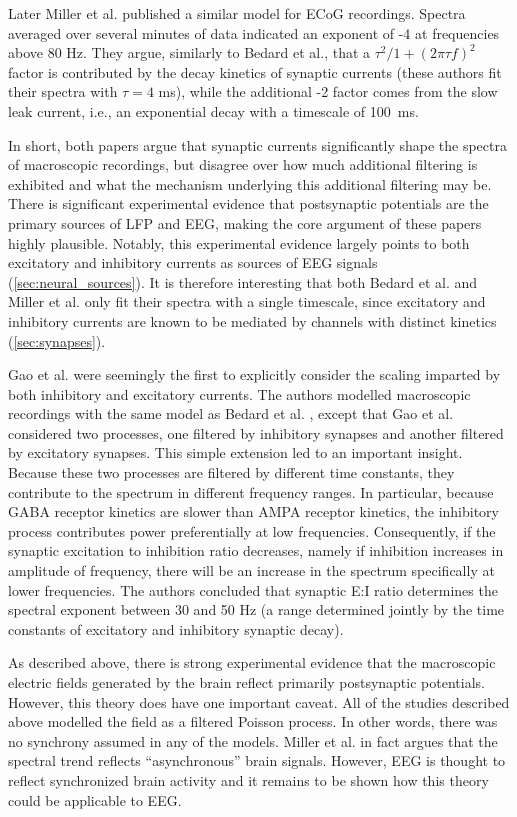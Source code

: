 Later Miller et al. \cite{Miller2009} published a similar model for ECoG recordings. Spectra averaged over several minutes of data indicated an exponent of -4 at frequencies above 80 Hz. They argue, similarly to Bedard et al., that a $\tau^2 / 1+ (2\pi\tau f)^2 $ factor is contributed by the decay kinetics of synaptic currents (these authors fit their spectra with $\tau=4$ \unit{\milli\second}), while the additional -2 factor comes from the slow leak current, i.e., an exponential decay with a timescale of \qty{100}{\milli\second}. 

In short, both papers argue that synaptic currents significantly shape the spectra of macroscopic recordings, but disagree over how much additional filtering is exhibited and what the mechanism underlying this additional filtering may be. There is significant experimental evidence that postsynaptic potentials are the primary sources of LFP and EEG, making the core argument of these papers highly plausible. Notably, this experimental evidence largely points to both excitatory and inhibitory currents as sources of EEG signals (\autoref{sec:neural_sources}). It is therefore interesting that both Bedard et al. and Miller et al. only fit their spectra with a single timescale, since excitatory and inhibitory currents are known to be mediated by channels with distinct kinetics (\autoref{sec:synapses}).

Gao et al. \cite{Gao2017} were seemingly the first to explicitly consider the scaling imparted by both inhibitory and excitatory currents. The authors modelled macroscopic recordings with the same model as Bedard et al. \cite{Bedard2006}, except that Gao et al. considered two processes, one filtered by inhibitory synapses and another filtered by excitatory synapses. This simple extension led to an important insight. Because these two processes are filtered by different time constants, they contribute to the spectrum in different frequency ranges. In particular, because GABA receptor kinetics are slower than AMPA receptor kinetics, the inhibitory process contributes power preferentially at low frequencies. Consequently, if the synaptic excitation to inhibition ratio decreases, namely if inhibition increases in amplitude of frequency, there will be an increase in the spectrum specifically at lower frequencies. The authors concluded that synaptic E:I ratio determines the spectral exponent between 30 and 50 Hz (a range determined jointly by the time constants of excitatory and inhibitory synaptic decay). 

As described above, there is strong experimental evidence that the macroscopic electric fields generated by the brain reflect primarily postsynaptic potentials. However, this theory does have one important caveat. All of the studies described above modelled the field as a filtered Poisson process. In other words, there was no synchrony assumed in any of the models. Miller et al.\cite{Miller2009} in fact argues that the spectral trend reflects ``asynchronous'' brain signals. However, EEG is thought to reflect synchronized brain activity and it remains to be shown how this theory could be applicable to EEG.

